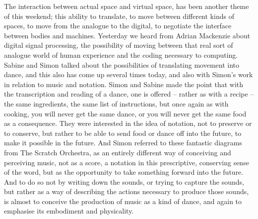 {The interaction between actual space and virtual space, has been another
theme of this weekend; this ability to translate, to move between
different kinds of spaces, to move from the analogue to the digital, to
negotiate the interface between bodies and machines. Yesterday we heard
from Adrian Mackenzie about digital signal processing, the possibility
of moving between that real sort of analogue world of human experience
and the coding necessary to computing. Sabine and Simon talked about
the possibilities of translating movement into dance, and this also has
come up several times today, and also with Simon's work in relation to
music and notation. Simon and Sabine made the point that with the
transcription and reading of a dance, one is offered {--} rather as
with a recipe {--} the same ingredients, the same list of instructions,
but once again as with cooking, you will never get the same dance, or
you will never get the same food as a consequence. They were interested
in the idea of notation, not to preserve or to conserve, but rather to
be able to send food or dance off into the future, to make it possible
in the future. And Simon referred to these fantastic diagrams from The
Scratch Orchestra, as an entirely different way of conceiving and
perceiving music, not as a score, a notation in this prescriptive,
conserving sense of the word, but as the opportunity to take something
forward into the future. And to do so not by writing down the sounds,
or trying to capture the sounds, but rather as a way of describing the
actions necessary to produce those sounds, is almost to conceive the
production of music as a kind of dance, and again to emphasise its
embodiment and physicality.

}

